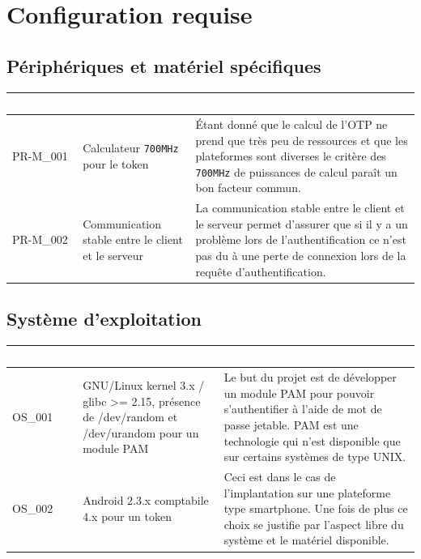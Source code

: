 \documentclass{"../../res/univ-projet"}
\begin{document}
\section{Configuration requise}

\subsection{Périphériques et matériel spécifiques}
\begin{tabular}{|p{}|p{}|p{}|}
    \hline
    \rowcolor{gray}
    \textcolor{white}{\bfseries Identifiant} & 
    \textcolor{white}{\bfseries Description} &
    \textcolor{white}{\bfseries Justification} \\
    \hline
    PR-M\_001 &
    Calculateur \verb?700MHz? pour le token &
    Étant donné que le calcul de l'OTP ne prend que très peu de ressources
    et que les plateformes sont diverses le critère des \verb?700MHz? de puissances
    de calcul paraît un bon facteur commun.\\
    \hline
    PR-M\_002 &
    Communication stable entre le client et le serveur &
    La communication stable entre le client et le serveur permet d'assurer que si
    il y a un problème lors de l'authentification ce n'est pas du à une perte de
    connexion lors de la requête d'authentification.\\
    \hline
\end{tabular}

\subsection{Système d'exploitation}
\begin{tabular}{|p{}|p{}|p{}|}
    \hline
    \rowcolor{gray}
    \textcolor{white}{\bfseries Identifiant} & 
    \textcolor{white}{\bfseries Description} &
    \textcolor{white}{\bfseries Justification} \\
    \hline
    OS\_001& 
    GNU/Linux kernel 3.x / glibc >= 2.15, présence de /dev/random et /dev/urandom 
    pour un module PAM&
    Le but du projet est de développer un module PAM pour pouvoir s'authentifier
    à l'aide de mot de passe jetable. PAM est une technologie qui n'est disponible
    que sur certains systèmes de type UNIX.\\
    \hline
    OS\_002&
    Android 2.3.x comptabile 4.x pour un token&
    Ceci est dans le cas de l'implantation sur une plateforme type
    smartphone. Une fois de plus ce choix se justifie par
    l'aspect libre du système et le matériel disponible.\\
    \hline
\end{tabular}
\end{document}
